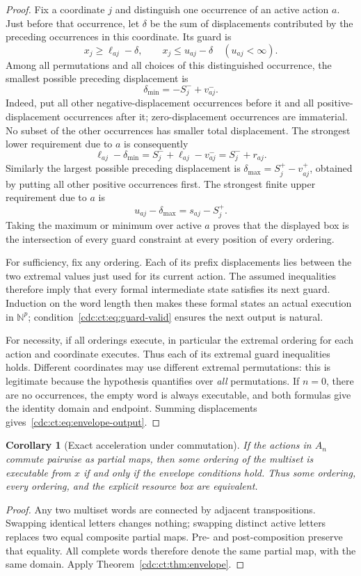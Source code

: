 \documentclass[11pt,a4paper]{article}
\newtheorem{corollary}[corollary]{Corollary}
\theoremstyle{definition}
\theoremstyle{remark}
\newcommand{\N}{\mathbb N}
\begin{document}
\begin{proof}
Fix a coordinate $j$ and distinguish one occurrence of an active action $a$. Just before that occurrence, let $\delta$ be the sum of displacements contributed by the preceding occurrences in this coordinate. Its guard is
\[
 x_j\ge\ell_{aj}-\delta,\qquad
 x_j\le u_{aj}-\delta\quad(u_{aj}<\infty).
\]
Among all permutations and all choices of this distinguished occurrence, the smallest possible preceding displacement is
\[
 \delta_{\min}=-S_j^-+v_{aj}^-.
\]
Indeed, put all other negative-displacement occurrences before it and all positive-displacement occurrences after it; zero-displacement occurrences are immaterial. No subset of the other occurrences has smaller total displacement. The strongest lower requirement due to $a$ is consequently
\[
 \ell_{aj}-\delta_{\min}
   =S_j^-+\ell_{aj}-v_{aj}^-
   =S_j^-+r_{aj}.
\]
Similarly the largest possible preceding displacement is
$\delta_{\max}=S_j^+-v_{aj}^+$, obtained by putting all other positive occurrences first. The strongest finite upper requirement due to $a$ is
\[
 u_{aj}-\delta_{\max}=s_{aj}-S_j^+.
\]
Taking the maximum or minimum over active $a$ proves that the displayed box is the intersection of every guard constraint at every position of every ordering.

For sufficiency, fix any ordering. Each of its prefix displacements lies between the two extremal values just used for its current action. The assumed inequalities therefore imply that every formal intermediate state satisfies its next guard. Induction on the word length then makes these formal states an actual execution in $\N^p$; condition~\eqref{cdc:ct:eq:guard-valid} ensures the next output is natural.

For necessity, if all orderings execute, in particular the extremal ordering for each action and coordinate executes. Thus each of its extremal guard inequalities holds. Different coordinates may use different extremal permutations: this is legitimate because the hypothesis quantifies over \emph{all} permutations. If $n=0$, there are no occurrences, the empty word is always executable, and both formulas give the identity domain and endpoint. Summing displacements gives~\eqref{cdc:ct:eq:envelope-output}.
\end{proof}

\begin{corollary}[Exact acceleration under commutation]\label{cdc:ct:cor:some-every}
If the actions in $A_n$ commute pairwise as partial maps, then \emph{some} ordering of the multiset is executable from $x$ if and only if the envelope conditions hold. Thus some ordering, every ordering, and the explicit resource box are equivalent.
\end{corollary}
\begin{proof}
Any two multiset words are connected by adjacent transpositions. Swapping identical letters changes nothing; swapping distinct active letters replaces two equal composite partial maps. Pre- and post-composition preserve that equality. All complete words therefore denote the same partial map, with the same domain. Apply Theorem~\ref{cdc:ct:thm:envelope}.
\end{proof}
\end{document}
